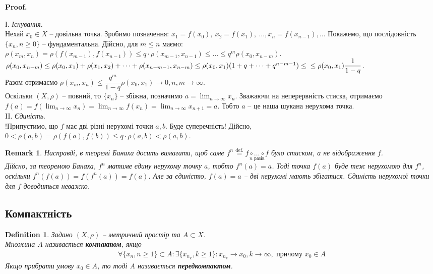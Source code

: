 \documentclass[a4paper, 10pt]{article}
\makeatletter
\theoremstyle{theoremdd}
\theoremstyle{theoremdd}
\newtheorem{definition}[theorem]{Definition}
\theoremstyle{theoremdd}
\theoremstyle{theoremdd}
\theoremstyle{theoremdd}
\theoremstyle{theoremdd}
\newtheorem{remark}[theorem]{Remark}
\theoremstyle{theoremdd}
\theoremstyle{theoremdd}
\renewenvironment{proof}[1][Proof.\\]{\par
\pushQED{\hfill \qed}%
\normalfont \topsep6\p@\@plus6\p@\relax
\trivlist
\item\relax
{\bfseries
#1\@addpunct{.}}\hspace\labelsep\ignorespaces
}{%
\popQED\endtrivlist\@endpefalse
}
\makeatother
\begin{document}
\begin{proof}
І. \textit{Існування}.\\
Нехай $x_0 \in X$ -- довільна точка. Зробимо позначення: $x_1 = f(x_0),\ x_2 = f(x_1),\ \dots, x_n = f(x_{n-1}), \dots$ Покажемо, що послідовність $\{x_n, n \geq 0\}$ -- фундаментальна. Дійсно, для $m \leq n$ маємо:\\
$\rho(x_m, x_n) = \rho(f(x_{m-1}), f(x_{n-1})) \leq q \cdot \rho(x_{m-1},x_{n-1}) \leq \dots \leq q^m \rho(x_0,x_{n-m})$.\\
$\rho(x_0,x_{n-m}) \leq \rho(x_0,x_1) + \rho(x_1,x_2) + \dots + \rho(x_{n-m-1}, x_{n-m}) \leq \rho(x_0,x_1)(1+q+\dots+q^{n-m-1}) \leq \\
\leq \rho (x_0,x_1) \dfrac{1}{1-q}$.\\
Разом отримаємо $\rho(x_m,x_n) \leq \dfrac{q^m}{1-q} \rho(x_0,x_1) \to 0, n,m \to \infty$.\\
Оскільки $(X,\rho)$ -- повний, то $\{x_n\}$ -- збіжна, позначимо $a = \displaystyle\lim_{n \to \infty} x_n$. Зважаючи на неперервність стиска, отримаємо $\displaystyle f(a) = f\left( \lim_{n \to \infty} x_n \right) = \lim_{n \to \infty} f(x_n) = \lim_{n \to \infty} x_{n+1} = a$. Тобто $a$ -- це наша шукана нерухома точка.
\bigskip \\
II. \textit{Єдиність}.\\
!Припустимо, що $f$ має дві різні нерухомі точки $a,b$. Буде суперечність! Дійсно,\\
$0 < \rho(a,b) = \rho(f(a),f(b)) \leq q \cdot \rho(a,b) < \rho(a,b)$.
\end{proof}

\begin{remark}
Насправді, в теоремі Банаха досить вимагати, щоб саме $f^n \overset{\text{def.}}{=} \underset{n\text{ разів}}{f \circ \dots \circ f}$ було стиском, а не відображення $f$.\\
Дійсно, за теоремою Банаха, $f^n$ матиме єдину нерухому точку $a$, тобто $f^n(a) = a$. Тоді точка $f(a)$ буде теж нерухомою для $f^n$, оскільки $f^n(f(a)) = f(f^n(a)) = f(a)$. Але за єдиністю, $f(a) = a$ -- дві нерухомі мають збігатися. Єдиність нерухомої точки для $f$ доводиться неважко.
\end{remark}

\subsection{Компактність}
\begin{definition}
Задано $(X,\rho)$ -- метричний простір та $A \subset X$.\\
Множина $A$ називається \textbf{компактом}, якщо
\begin{align*}
\forall \{x_n, n \geq 1\} \subset A: \exists \{x_{n_k}, k \geq 1\}: x_{n_k} \to x_0, k \to \infty, \text{ причому } x_0 \in A
\end{align*}
Якщо прибрати умову $x_0 \in A$, то тоді $A$ називається \textbf{передкомпактом}.
\end{definition}
\end{document}
